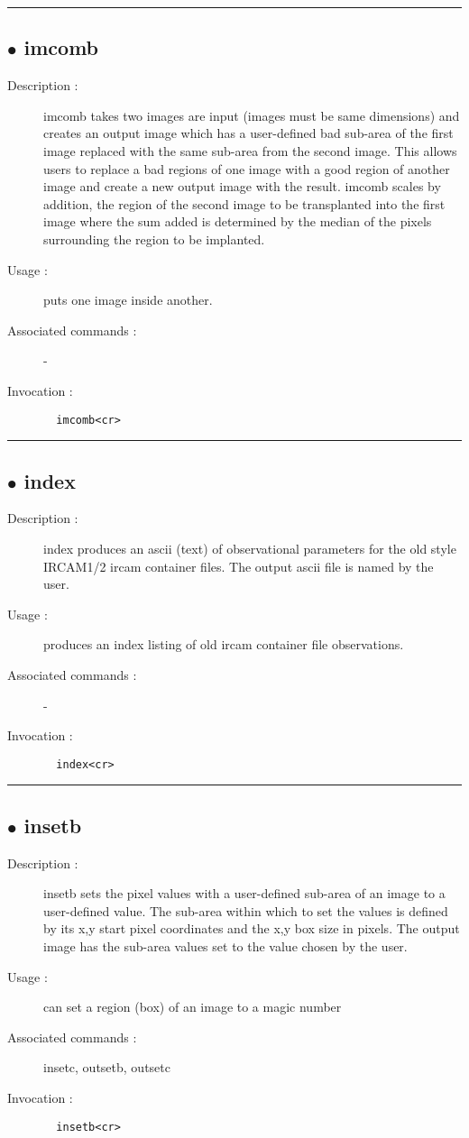 \hrule \subsection*{$\bullet$ imcomb}
\begin{description}
\item[Description :] imcomb takes two images are input (images must be same
dimensions) and creates an output image which has a user-defined bad
sub-area of the first image replaced with the same sub-area from the
second image.  This allows users to replace a bad regions of one image
with a good region of another image and create a new output image with
the result.  imcomb scales by addition, the region of the second image to
be transplanted into the first image where the sum added is determined by
the median of the pixels surrounding the region to be implanted.
\item[Usage :] puts one image inside another.
\item[Associated commands :] -
\item[Invocation :]

\verb+  imcomb<cr> +\end{description}

\hrule \subsection*{$\bullet$ index}
\begin{description}
\item[Description :] index produces an ascii (text) of observational parameters for
the old style {\sc IRCAM1/2} ircam container files.  The output ascii file is
named by the user.
\item[Usage :] produces an index listing of old ircam container file
observations.
\item[Associated commands :] -
\item[Invocation :]

\verb+  index<cr> +\end{description}

\hrule \subsection*{$\bullet$ insetb}
\begin{description}
\item[Description :] insetb sets the pixel values with a user-defined sub-area of an
image to a user-defined value.  The sub-area within which to set the
values is defined by its x,y start pixel coordinates and the x,y box size
in pixels.  The output image has the sub-area values set to the value
chosen by the user.  
\item[Usage :] can set a region (box) of an image to a magic number
\item[Associated commands :] insetc, outsetb, outsetc
\item[Invocation :]

\verb+  insetb<cr> +\end{description}

